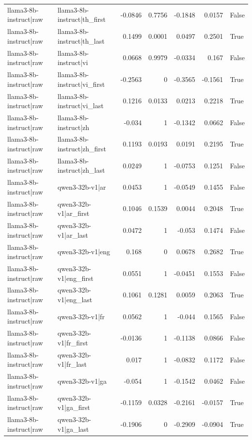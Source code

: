 \begin{table}
\begin{tabular}{l l r r r r l}
llama3-8b-instruct|raw & llama3-8b-instruct|th_first & -0.0846 & 0.7756 & -0.1848 & 0.0157 & False \\
llama3-8b-instruct|raw & llama3-8b-instruct|th_last & 0.1499 & 0.0001 & 0.0497 & 0.2501 & True \\
llama3-8b-instruct|raw & llama3-8b-instruct|vi & 0.0668 & 0.9979 & -0.0334 & 0.167 & False \\
llama3-8b-instruct|raw & llama3-8b-instruct|vi_first & -0.2563 & 0 & -0.3565 & -0.1561 & True \\
llama3-8b-instruct|raw & llama3-8b-instruct|vi_last & 0.1216 & 0.0133 & 0.0213 & 0.2218 & True \\
llama3-8b-instruct|raw & llama3-8b-instruct|zh & -0.034 & 1 & -0.1342 & 0.0662 & False \\
llama3-8b-instruct|raw & llama3-8b-instruct|zh_first & 0.1193 & 0.0193 & 0.0191 & 0.2195 & True \\
llama3-8b-instruct|raw & llama3-8b-instruct|zh_last & 0.0249 & 1 & -0.0753 & 0.1251 & False \\
llama3-8b-instruct|raw & qwen3-32b-v1|ar & 0.0453 & 1 & -0.0549 & 0.1455 & False \\
llama3-8b-instruct|raw & qwen3-32b-v1|ar_first & 0.1046 & 0.1539 & 0.0044 & 0.2048 & True \\
llama3-8b-instruct|raw & qwen3-32b-v1|ar_last & 0.0472 & 1 & -0.053 & 0.1474 & False \\
llama3-8b-instruct|raw & qwen3-32b-v1|eng & 0.168 & 0 & 0.0678 & 0.2682 & True \\
llama3-8b-instruct|raw & qwen3-32b-v1|eng_first & 0.0551 & 1 & -0.0451 & 0.1553 & False \\
llama3-8b-instruct|raw & qwen3-32b-v1|eng_last & 0.1061 & 0.1281 & 0.0059 & 0.2063 & True \\
llama3-8b-instruct|raw & qwen3-32b-v1|fr & 0.0562 & 1 & -0.044 & 0.1565 & False \\
llama3-8b-instruct|raw & qwen3-32b-v1|fr_first & -0.0136 & 1 & -0.1138 & 0.0866 & False \\
llama3-8b-instruct|raw & qwen3-32b-v1|fr_last & 0.017 & 1 & -0.0832 & 0.1172 & False \\
llama3-8b-instruct|raw & qwen3-32b-v1|ga & -0.054 & 1 & -0.1542 & 0.0462 & False \\
llama3-8b-instruct|raw & qwen3-32b-v1|ga_first & -0.1159 & 0.0328 & -0.2161 & -0.0157 & True \\
llama3-8b-instruct|raw & qwen3-32b-v1|ga_last & -0.1906 & 0 & -0.2909 & -0.0904 & True \\

\end{tabular}
\end{table}
